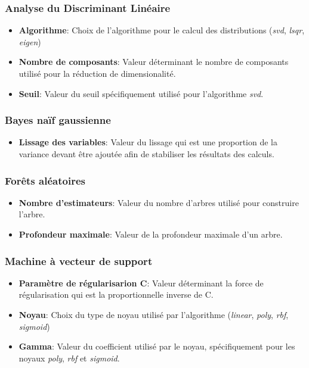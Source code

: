 \subsubsection*{Analyse du Discriminant Linéaire}
\begin{itemize}
	\item \textbf{Algorithme}: Choix de l'algorithme pour le calcul des distributions (\emph{svd}, \emph{lsqr}, \emph{eigen})
	\item \textbf{Nombre de composants}: Valeur déterminant le nombre de composants utilisé pour la réduction de dimensionalité.
	\item \textbf{Seuil}: Valeur du seuil spécifiquement utilisé pour l'algorithme \emph{svd}.
\end{itemize}

\subsubsection*{Bayes naïf gaussienne}
\begin{itemize}
	\item \textbf{Lissage des variables}: Valeur du lissage qui est une proportion de la variance devant être ajoutée afin de stabiliser les résultats des calculs.
\end{itemize}

\subsubsection*{Forêts aléatoires}
\begin{itemize}
	\item \textbf{Nombre d'estimateurs}: Valeur du nombre d'arbres utilisé pour construire l'arbre.
	\item \textbf{Profondeur maximale}: Valeur de la profondeur maximale d'un arbre.
\end{itemize}

\subsubsection*{Machine à vecteur de support}
\begin{itemize}
	\item \textbf{Paramètre de régularisarion C}: Valeur déterminant la force de régularisation qui est la proportionnelle inverse de C.
	\item \textbf{Noyau}: Choix du type de noyau utilisé par l'algorithme (\emph{linear}, \emph{poly}, \emph{rbf}, \emph{sigmoid})
	\item \textbf{Gamma}: Valeur du coefficient utilisé par le noyau, spécifiquement pour les noyaux \emph{poly}, \emph{rbf} et \emph{sigmoid}.
\end{itemize}

